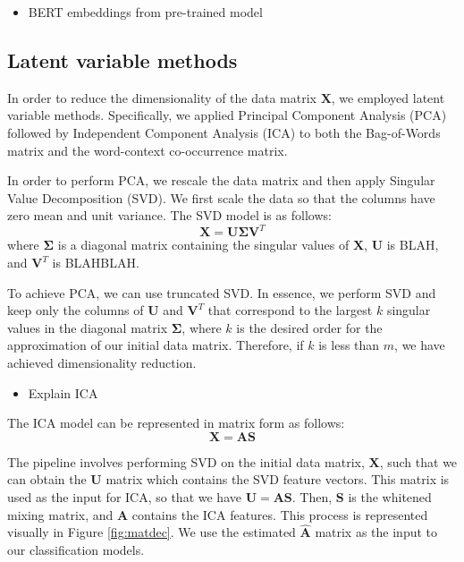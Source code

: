 \documentclass{article}
\begin{document}
\begin{itemize}
\tightlist
\item
  BERT embeddings from pre-trained model
\end{itemize}

\hypertarget{latent-variable-methods}{%
\subsection{Latent variable methods}\label{latent-variable-methods}}

In order to reduce the dimensionality of the data matrix \(\mathbf{X}\),
we employed latent variable methods. Specifically, we applied Principal
Component Analysis (PCA) followed by Independent Component Analysis
(ICA) to both the Bag-of-Words matrix and the word-context co-occurrence
matrix.

In order to perform PCA, we rescale the data matrix and then apply
Singular Value Decomposition (SVD). We first scale the data so that the
columns have zero mean and unit variance. The SVD model is as follows:
\[\mathbf{X = U \Sigma V}^T\] where \(\mathbf{\Sigma}\) is a diagonal
matrix containing the singular values of \(\mathbf{X}\), \(\mathbf{U}\)
is BLAH, and \(\mathbf{V}^T\) is BLAHBLAH.

To achieve PCA, we can use truncated SVD. In essence, we perform SVD and
keep only the columns of \(\mathbf{U}\) and \(\mathbf{V}^T\) that
correspond to the largest \(k\) singular values in the diagonal matrix
\(\mathbf{\Sigma}\), where \(k\) is the desired order for the
approximation of our initial data matrix. Therefore, if \(k\) is less
than \(m\), we have achieved dimensionality reduction.

\begin{itemize}
\tightlist
\item
  Explain ICA
\end{itemize}

The ICA model can be represented in matrix form as follows:
\[\mathbf{X = AS}\]

The pipeline involves performing SVD on the initial data matrix,
\(\mathbf{X}\), such that we can obtain the \(\mathbf{U}\) matrix which
contains the SVD feature vectors. This matrix is used as the input for
ICA, so that we have \(\mathbf{U = AS}\). Then, \(\mathbf{S}\) is the
whitened mixing matrix, and \(\mathbf{A}\) contains the ICA features.
This process is represented visually in Figure \ref{fig:matdec}. We use
the estimated \(\mathbf{\hat{A}}\) matrix as the input to our
classification models.
\end{document}
